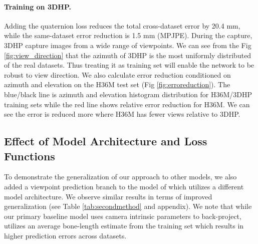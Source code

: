 \documentclass[runningheads]{llncs}
\begin{document}
\paragraph{Training on 3DHP.}   Adding the quaternion loss reduces the total 
cross-dataset error by 20.4 mm, while the same-dataset error reduction is 1.5 mm (MPJPE).
During the capture, 3DHP capture images from a wide range of viewpoints. We can see from the Fig \ref{fig:view_direction} that the azimuth
of 3DHP is the most uniformly distributed of the real datasets. Thus treating
it as training set will enable the network to be robust to view direction. 
We also calculate error reduction conditioned on azimuth and
elevation on the H36M test set (Fig \ref{fig:erroreduction}). The blue/black line is azimuth and elevation histogram
distribution for H36M/3DHP training sets while the red line shows relative error
reduction for H36M. We can see the error is reduced more where H36M has
fewer views relative to 3DHP. 




\subsection{Effect of Model Architecture and Loss Functions}
To demonstrate the generalization of
our approach to other models, we also added a viewpoint prediction branch
to the model of \cite{Zhou_2017_ICCV} which utilizes a different model 
architecture. We observe similar results in terms of improved generalization
(see Table \ref{tab:secondmethod} and appendix). We note that while our
primary baseline model \cite{rootnet} uses camera intrinsic parameters to
back-project, \cite{Zhou_2017_ICCV} utilizes an average bone-length estimate
from the training set which results in higher prediction errors across datasets.
\end{document}
